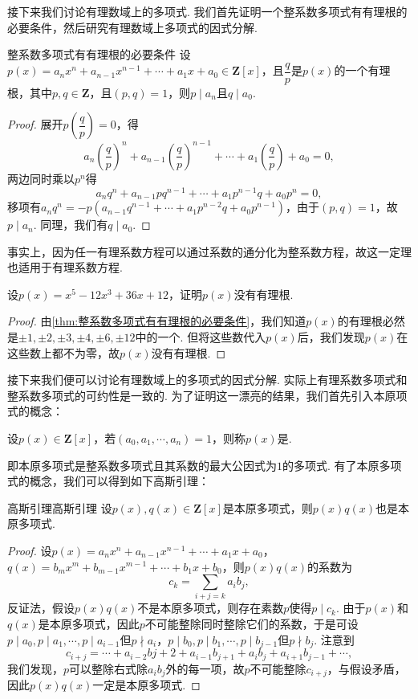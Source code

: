 接下来我们讨论有理数域上的多项式. 我们首先证明一个整系数多项式有有理根的必要条件，然后研究有理数域上多项式的因式分解.
\begin{theorem}{}{整系数多项式有有理根的必要条件}
    设$p(x)=a_nx^n+a_{n-1}x^{n-1}+\cdots+a_1x+a_0\in\mathbf{Z}[x]$，且$\dfrac{q}{p}$是$p(x)$的一个有理根，其中$p,q\in\mathbf{Z}$，且$(p,q)=1$，则$p\mid a_n$且$q\mid a_0$.
\end{theorem}
\begin{proof}
    展开$p\left(\dfrac{q}{p}\right)=0$，得
    \[a_n\left(\dfrac{q}{p}\right)^n+a_{n-1}\left(\dfrac{q}{p}\right)^{n-1}+\cdots+a_1\left(\dfrac{q}{p}\right)+a_0=0,\]
    两边同时乘以$p^n$得
    \[a_nq^n+a_{n-1}pq^{n-1}+\cdots+a_1p^{n-1}q+a_0p^n=0,\]
    移项有$a_nq^n=-p(a_{n-1}q^{n-1}+\cdots+a_1p^{n-2}q+a_0p^{n-1})$，由于$(p,q)=1$，故$p\mid a_n$. 同理，我们有$q\mid a_0$.
\end{proof}

事实上，因为任一有理系数方程可以通过系数的通分化为整系数方程，故这一定理也适用于有理系数方程.
\begin{example}{}{}
    设$p(x)=x^5-12x^3+36x+12$，证明$p(x)$没有有理根.
\end{example}
\begin{proof}
    由\autoref{thm:整系数多项式有有理根的必要条件}，我们知道$p(x)$的有理根必然是$\pm 1,\pm 2,\pm 3,\pm 4,\pm 6,\pm 12$中的一个. 但将这些数代入$p(x)$后，我们发现$p(x)$在这些数上都不为零，故$p(x)$没有有理根.
\end{proof}

接下来我们便可以讨论有理数域上的多项式的因式分解. 实际上有理系数多项式和整系数多项式的可约性是一致的. 为了证明这一漂亮的结果，我们首先引入本原项式的概念：
\begin{definition}{}{}
    设$p(x)\in\mathbf{Z}[x]$，若$(a_0,a_1,\cdots,a_n)=1$，则称$p(x)$是.
\end{definition}
即本原多项式是整系数多项式且其系数的最大公因式为$1$的多项式. 有了本原多项式的概念，我们可以得到如下高斯引理：
\begin{lemma}{高斯引理}{高斯引理}
    设$p(x),q(x)\in\mathbf{Z}[x]$是本原多项式，则$p(x)q(x)$也是本原多项式.
\end{lemma}
\begin{proof}
    设$p(x)=a_nx^n+a_{n-1}x^{n-1}+\cdots+a_1x+a_0$，$q(x)=b_mx^m+b_{m-1}x^{m-1}+\cdots+b_1x+b_0$，则$p(x)q(x)$的系数为
    \[c_k=\sum_{i+j=k}a_ib_j,\]
    反证法，假设$p(x)q(x)$不是本原多项式，则存在素数$p$使得$p\mid c_k$. 由于$p(x)$和$q(x)$是本原多项式，因此$p$不可能整除同时整除它们的系数，于是可设$p\mid a_0,p\mid a_1,\cdots,p\mid a_{i-1}$但$p\nmid a_i$，$p\mid b_0,p\mid b_1,\cdots,p\mid b_{j-1}$但$p\nmid b_j$. 注意到
    \[c_{i+j}=\cdots+a_{i-2}b{j+2}+a_{i-1}b_{j+1}+a_ib_j+a_{i+1}b_{j-1}+\cdots,\]
    我们发现，$p$可以整除右式除$a_ib_j$外的每一项，故$p$不可能整除$c_{i+j}$，与假设矛盾，因此$p(x)q(x)$一定是本原多项式.
\end{proof}

